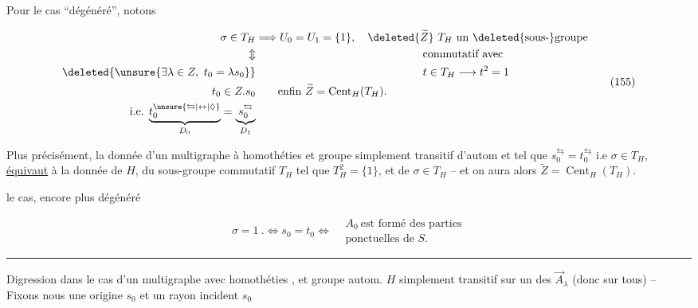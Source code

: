 

Pour le cas ``dégénéré'', notons

\[
\begin{aligned}
\sigma\in T_H&\Longrightarrow U_0=U_1=\{1\},\quad \deleted{\widetilde Z}\ T_H\ \text{un }\deleted{\text{sous-}}\text{groupe}\\
\Updownarrow&\hspace{15em}\text{commutatif avec}\\
\deleted{\unsure{\exists\lambda\in Z,\ t_0=\lambda s_0}}&\hspace{15em}t\in T_H\longrightarrow t^2=1\\
t_0\in Z.s_0&\qquad\text{enfin }\widetilde Z=\operatorname{Cent}_H(T_H).\\
\text{i.e. }\underset{D_0}{\underbrace{t_0^{\unsure{\leftrightarrows|\leftrightarrow|\Diamond}}}}
=\underset{D_1}{\underbrace{s_0^{\leftrightarrows}}}&
\end{aligned}\tag*{(155)}
\]


 Plus précisément, la donnée d'un multigraphe à homothéties et groupe simplement transitif d'autom   et tel que $s_0^{\leftrightarrows}=t_0^{\leftrightarrows}$ i.e $\sigma\in T_H$, \uline{équivaut} à la donnée de $H$, du sous-groupe commutatif $T_H$ tel que $T_H^2=\{1\}$, et de $\sigma\in T_H$ -- et on aura alors $\widetilde Z=\operatorname{Cent}_H(T_H)$.

 le cas, encore plus dégénéré

\[
\sigma=1\ .\Longleftrightarrow s_0=t_0\Longleftrightarrow
\begin{aligned}& A_0\ \text{est formé des parties}\\[-2pt]&\text{ponctuelles de }S.\end{aligned}\tag*{(156)}
\]

\begin{center}\rule{2.1cm}{0.3pt}\end{center}

 Digression dans le cas d'un multigraphe avec  homothéties , et groupe autom. $H$ simplement transitif sur  un des $\overrightarrow A_\lambda$ (donc sur tous) -- Fixons nous une origine $s_0$ et un rayon incident  $s_0$

